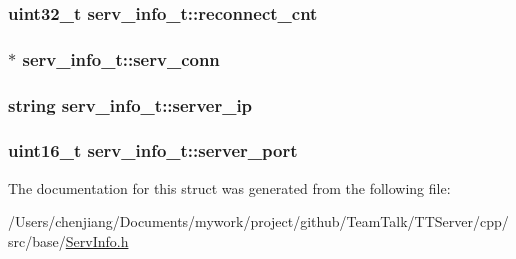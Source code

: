 \subsubsection[{reconnect\+\_\+cnt}]{\setlength{\rightskip}{0pt plus 5cm}uint32\+\_\+t serv\+\_\+info\+\_\+t\+::reconnect\+\_\+cnt}\label{structserv__info__t_ad748792c213ac63b9214a1b6ebd101eb}
\hypertarget{structserv__info__t_a312f92c0c183e16f5715f781eb6a5891}{}
\subsubsection[{serv\+\_\+conn}]{$\ast$ serv\+\_\+info\+\_\+t\+::serv\+\_\+conn}\label{structserv__info__t_a312f92c0c183e16f5715f781eb6a5891}
\hypertarget{structserv__info__t_ac68355b18220ac21aa80a93c1a07ed16}{}
\subsubsection[{server\+\_\+ip}]{\setlength{\rightskip}{0pt plus 5cm}string serv\+\_\+info\+\_\+t\+::server\+\_\+ip}\label{structserv__info__t_ac68355b18220ac21aa80a93c1a07ed16}
\hypertarget{structserv__info__t_a852cb081e2edc1969b7629840b5a2b67}{}
\subsubsection[{server\+\_\+port}]{\setlength{\rightskip}{0pt plus 5cm}uint16\+\_\+t serv\+\_\+info\+\_\+t\+::server\+\_\+port}\label{structserv__info__t_a852cb081e2edc1969b7629840b5a2b67}


The documentation for this struct was generated from the following file\+:\begin{DoxyCompactItemize}
\item 
/\+Users/chenjiang/\+Documents/mywork/project/github/\+Team\+Talk/\+T\+T\+Server/cpp/src/base/\hyperlink{_serv_info_8h}{Serv\+Info.\+h}\end{DoxyCompactItemize}
